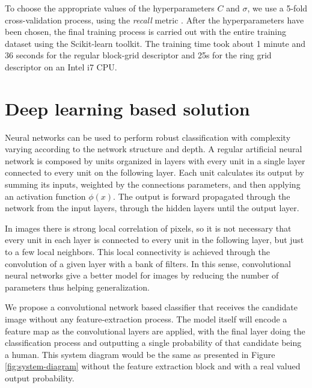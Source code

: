       To choose the appropriate values of the hyperparameters $C$ and $\sigma$, we use a 5-fold cross-validation process, using the \textit{recall} metric \cite{evaluationMetrics}. After the hyperparameters have been chosen, the final training process is carried out with the entire training dataset using the Scikit-learn \cite{scikit-learn} toolkit. The training time took about 1 minute and 36 seconds for the regular block-grid descriptor and 25s for the ring grid descriptor on an Intel i7 CPU.


\section{Deep learning based solution}
\label{sec:deep}

    Neural networks can be used to perform robust classification with complexity varying according to the network structure and depth. A regular artificial neural network is composed by units organized in layers with every unit in a single layer connected to every unit on the following layer. Each unit calculates its output by summing its inputs, weighted by the connections parameters, and then applying an activation function $\phi(x)$. The output is forward propagated through the network from the input layers, through the hidden layers until the output layer.

    In images there is strong local correlation of pixels, so it is not necessary that every unit in each layer is connected to every unit in the following layer, but just to a few local neighbors. This local connectivity is achieved through the convolution of a given layer with a bank of filters. In this sense, convolutional neural networks give a better model for images by reducing the number of parameters thus helping generalization.

    We propose a convolutional network based classifier that receives the candidate image without any feature-extraction process. The model itself will encode a feature map as the convolutional layers are applied, with the final layer doing the classification process and outputting a single probability of that candidate being a human. This system diagram would be the same as presented in Figure \ref{fig:system-diagram} without the feature extraction block and with a real valued output probability.

